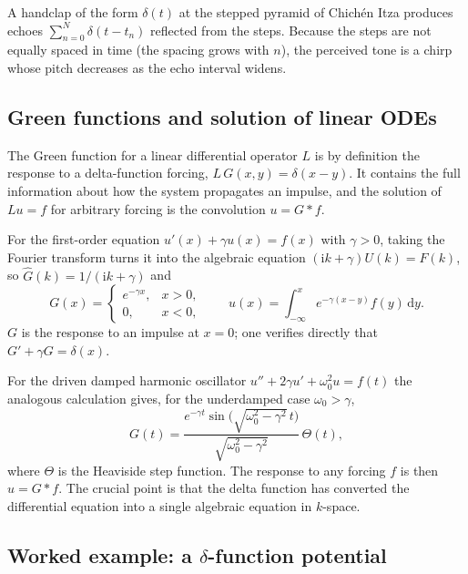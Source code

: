 \begin{example}
A handclap of the form $\delta(t)$ at the stepped pyramid of Chich\'en Itza produces echoes $\sum_{n=0}^N\delta(t-t_n)$ reflected from the steps. Because the steps are not equally spaced in time (the spacing grows with $n$), the perceived tone is a chirp whose pitch decreases as the echo interval widens.
\end{example}

\subsection{Green functions and solution of linear ODEs}

The Green function for a linear differential operator $L$ is by definition the response to a delta-function forcing, $L\,G(x,y)=\delta(x-y)$. It contains the full information about how the system propagates an impulse, and the solution of $L u=f$ for arbitrary forcing is the convolution $u=G*f$.

For the first-order equation $u'(x)+\gamma u(x)=f(x)$ with $\gamma>0$, taking the Fourier transform turns it into the algebraic equation $(\mathrm{i}k+\gamma)U(k)=F(k)$, so $\widehat{G}(k)=1/(\mathrm{i}k+\gamma)$ and
\begin{equation}
G(x)=
\begin{cases}
e^{-\gamma x}, & x>0,\\
0, & x<0,
\end{cases}
\qquad
u(x)=\int_{-\infty}^{x}e^{-\gamma(x-y)}f(y)\,\mathrm{d}y.
\end{equation}
$G$ is the response to an impulse at $x=0$; one verifies directly that $G'+\gamma G=\delta(x)$.

For the driven damped harmonic oscillator $u''+2\gamma u'+\omega_0^2 u=f(t)$ the analogous calculation gives, for the underdamped case $\omega_0>\gamma$,
\begin{equation}
G(t)=\frac{e^{-\gamma t}\sin\!\bigl(\sqrt{\omega_0^2-\gamma^2}\,t\bigr)}{\sqrt{\omega_0^2-\gamma^2}}\,\Theta(t),
\end{equation}
where $\Theta$ is the Heaviside step function. The response to any forcing $f$ is then $u=G*f$. The crucial point is that the delta function has converted the differential equation into a single algebraic equation in $k$-space.

\subsection{Worked example: a $\delta$-function potential}

